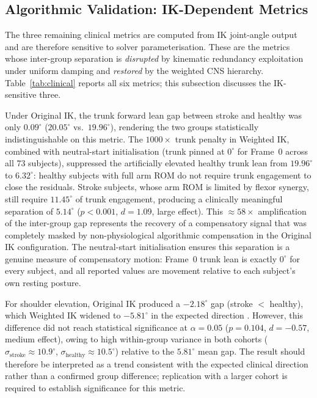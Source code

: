 \documentclass[journal,10pt,twocolumn]{IEEEtran}
\begin{document}
\subsection{Algorithmic Validation: IK-Dependent Metrics}
\label{sec:ik_validation}

The three remaining clinical metrics are computed from IK joint-angle
output and are therefore sensitive to solver parameterisation.
These are the metrics whose inter-group separation is \emph{disrupted}
by kinematic redundancy exploitation under uniform damping and \emph{restored} by the weighted
CNS hierarchy. Table~\ref{tab:clinical} reports all six metrics; this
subsection discusses the IK-sensitive three.

Under Original IK, the trunk forward lean gap between stroke and healthy
was only $0.09^{\circ}$ ($20.05^{\circ}$ vs.\ $19.96^{\circ}$), rendering
the two groups statistically indistinguishable on this metric.
The $1000\times$ trunk penalty in Weighted IK, combined with neutral-start
initialisation (trunk pinned at $0^{\circ}$ for Frame~0 across all 73
subjects), suppressed the artificially elevated healthy trunk lean from
$19.96^{\circ}$ to $6.32^{\circ}$: healthy subjects with full arm ROM do
not require trunk engagement to close the residuals. Stroke subjects, whose
arm ROM is limited by flexor synergy, still require $11.45^{\circ}$ of
trunk engagement, producing a clinically meaningful separation of
$5.14^{\circ}$ ($p{<}0.001$, $d{=}1.09$, large effect).
This ${\approx}58\times$ amplification of the inter-group gap represents the
recovery of a compensatory signal that was completely masked by non-physiological
algorithmic compensation in the Original IK configuration.
The neutral-start initialisation ensures this separation is a genuine
measure of compensatory motion: Frame~0 trunk lean is exactly $0^{\circ}$
for every subject, and all reported values are movement relative to each
subject's own resting posture.

For shoulder elevation, Original IK produced a $-2.18^{\circ}$ gap
(stroke $<$ healthy), which Weighted IK widened to $-5.81^{\circ}$ in
the expected direction \cite{wagner2007}. However, this difference did not
reach statistical significance at $\alpha{=}0.05$ ($p{=}0.104$,
$d{=}-0.57$, medium effect), owing to high within-group variance
in both cohorts ($\sigma_\text{stroke}{\approx}10.9^{\circ}$,
$\sigma_\text{healthy}{\approx}10.5^{\circ}$) relative to the $5.81^{\circ}$
mean gap. The result should therefore be interpreted as a trend consistent
with the expected clinical direction rather than a confirmed group
difference; replication with a larger cohort is required to establish
significance for this metric.
\end{document}
